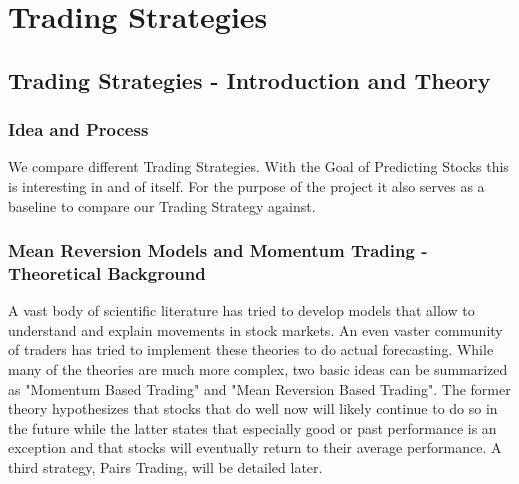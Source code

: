 \chapter{Trading Strategies}\label{ch:predictions}

\section{Trading Strategies - Introduction and Theory}
\subsection{Idea and Process}
We compare different Trading Strategies. With the Goal of Predicting Stocks this is interesting in and of itself. For the purpose of the project it also serves as a baseline to compare our Trading Strategy against. 

\subsection{Mean Reversion Models and Momentum Trading - Theoretical Background}

A vast body of scientific literature has tried to develop models that allow to understand and explain movements in stock markets. An even vaster community of traders has tried to implement these theories to do actual forecasting. While many of the theories are much more complex, two basic ideas can be summarized as "Momentum Based Trading" and "Mean Reversion Based Trading". The former theory hypothesizes that stocks that do well now will likely continue to do so in the future while the latter states that especially good or past performance is an exception and that stocks will eventually return to their average performance. A third strategy, Pairs Trading, will be detailed later. 

